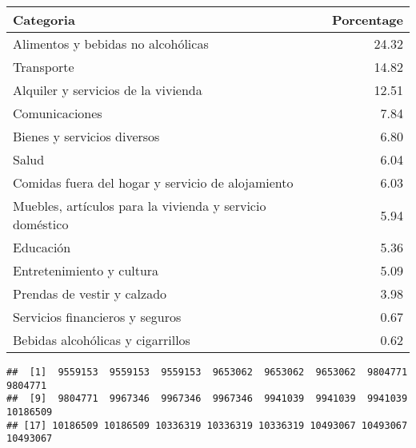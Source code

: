 \documentclass[
]{article}
\newenvironment{Shaded}{\begin{snugshade}}{\end{snugshade}}
\newcommand{\AttributeTok}[1]{\textcolor[rgb]{0.13,0.29,0.53}{#1}}
\newcommand{\DecValTok}[1]{\textcolor[rgb]{0.00,0.00,0.81}{#1}}
\newcommand{\FunctionTok}[1]{\textcolor[rgb]{0.13,0.29,0.53}{\textbf{#1}}}
\newcommand{\NormalTok}[1]{#1}
\newcommand{\OtherTok}[1]{\textcolor[rgb]{0.56,0.35,0.01}{#1}}
\newcommand{\SpecialCharTok}[1]{\textcolor[rgb]{0.81,0.36,0.00}{\textbf{#1}}}
\newcommand{\StringTok}[1]{\textcolor[rgb]{0.31,0.60,0.02}{#1}}
\begin{document}
\begin{longtable}[]{@{}lr@{}}
\toprule\noalign{}
Categoria & Porcentage \\
\midrule\noalign{}
\endhead
\bottomrule\noalign{}
\endlastfoot
Alimentos y bebidas no alcohólicas & 24.32 \\
Transporte & 14.82 \\
Alquiler y servicios de la vivienda & 12.51 \\
Comunicaciones & 7.84 \\
Bienes y servicios diversos & 6.80 \\
Salud & 6.04 \\
Comidas fuera del hogar y servicio de alojamiento & 6.03 \\
Muebles, artículos para la vivienda y servicio doméstico & 5.94 \\
Educación & 5.36 \\
Entretenimiento y cultura & 5.09 \\
Prendas de vestir y calzado & 3.98 \\
Servicios financieros y seguros & 0.67 \\
Bebidas alcohólicas y cigarrillos & 0.62 \\
\end{longtable}

\begin{Shaded}
\end{Shaded}

\begin{verbatim}
##  [1]  9559153  9559153  9559153  9653062  9653062  9653062  9804771  9804771
##  [9]  9804771  9967346  9967346  9967346  9941039  9941039  9941039 10186509
## [17] 10186509 10186509 10336319 10336319 10336319 10493067 10493067 10493067
\end{verbatim}
\end{document}
